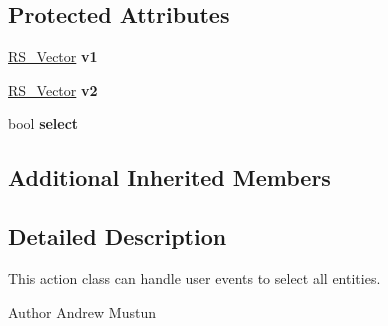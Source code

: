 \subsection*{Protected Attributes}
\begin{DoxyCompactItemize}
\item 
\hypertarget{classRS__ActionSelectIntersected_aebbd20d2b7fc716a2a62a7457040906a}{\hyperlink{classRS__Vector}{R\-S\-\_\-\-Vector} {\bfseries v1}}\label{classRS__ActionSelectIntersected_aebbd20d2b7fc716a2a62a7457040906a}

\item 
\hypertarget{classRS__ActionSelectIntersected_ad23be7acc2c064747b24af495a279ed8}{\hyperlink{classRS__Vector}{R\-S\-\_\-\-Vector} {\bfseries v2}}\label{classRS__ActionSelectIntersected_ad23be7acc2c064747b24af495a279ed8}

\item 
\hypertarget{classRS__ActionSelectIntersected_a5f0bb788dd702bc00f1772171f4c8bc3}{bool {\bfseries select}}\label{classRS__ActionSelectIntersected_a5f0bb788dd702bc00f1772171f4c8bc3}

\end{DoxyCompactItemize}
\subsection*{Additional Inherited Members}


\subsection{Detailed Description}
This action class can handle user events to select all entities.

\begin{DoxyAuthor}{Author}
Andrew Mustun 
\end{DoxyAuthor}


